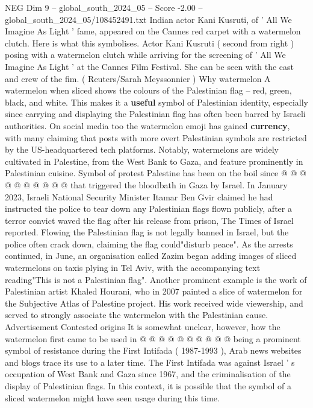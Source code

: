 \begin{textsample}{NEG Dim 9 – global\_south\_2024\_05 – Score -2.00 – global\_south\_2024\_05/108452491.txt}  \label{ex:f9_neg_329}
Indian actor Kani Kusruti, of ' All We Imagine As Light ' fame, appeared on the Cannes red carpet with a watermelon clutch.
Here is what this symbolises.
Actor Kani Kusruti ( second from right ) posing with a watermelon clutch while arriving for the screening of ' All We Imagine As Light ' at the Cannes Film Festival.
She can be seen with the cast and crew of the fim. ( Reuters/Sarah Meyssonnier ) Why watermelon A watermelon when sliced shows the colours of the Palestinian flag -- red, green, black, and white.
This makes it a \textbf{useful} symbol of Palestinian identity, especially since carrying and displaying the Palestinian flag has often been barred by Israeli authorities.
On social media too the watermelon emoji has gained \textbf{currency}, with many claiming that posts with more overt Palestinian symbols are restricted by the US-headquartered tech platforms.
Notably, watermelons are widely cultivated in Palestine, from the West Bank to Gaza, and feature prominently in Palestinian cuisine.
Symbol of protest Palestine has been on the boil since @ @ @ @ @ @ @ @ @ @ that triggered the bloodbath in Gaza by Israel.
In January 2023, Israeli National Security Minister Itamar Ben Gvir claimed he had instructed the police to tear down any Palestinian flags flown publicly, after a terror convict waved the flag after his release from prison, The Times of Israel reported.
Flowing the Palestinian flag is not legally banned in Israel, but the police often crack down, claiming the flag could"disturb peace".
As the arrests continued, in June, an organisation called Zazim began adding images of sliced watermelons on taxis plying in Tel Aviv, with the accompanying text reading"This is not a Palestinian flag".
Another prominent example is the work of Palestinian artist Khaled Hourani, who in 2007 painted a slice of watermelon for the Subjective Atlas of Palestine project.
His work received wide viewership, and served to strongly associate the watermelon with the Palestinian cause.
Advertisement Contested origins It is somewhat unclear, however, how the watermelon first came to be used in @ @ @ @ @ @ @ @ @ @ being a prominent symbol of resistance during the First Intifada ( 1987-1993 ), Arab news websites and blogs trace its use to a later time.
The First Intifada was against Israel ' s occupation of West Bank and Gaza since 1967, and the criminalisation of the display of Palestinian flags.
In this context, it is possible that the symbol of a sliced watermelon might have seen usage during this time.

\end{textsample}

